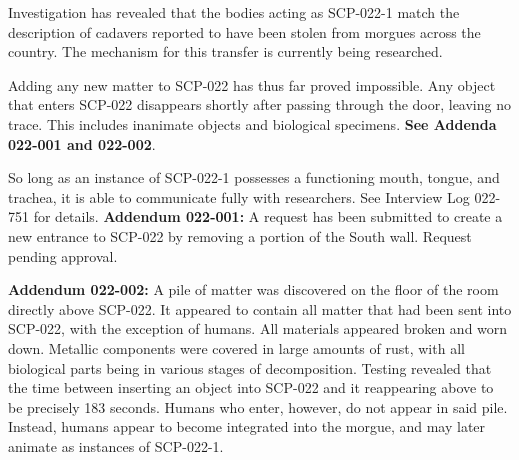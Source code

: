 Investigation has revealed that the bodies acting as SCP-022-1 match the description of cadavers reported to have been stolen from morgues across the country. The mechanism for this transfer is currently being researched.

Adding any new matter to SCP-022 has thus far proved impossible. Any object that enters SCP-022 disappears shortly after passing through the door, leaving no trace. This includes inanimate objects and biological specimens. \textbf{See Addenda 022-001 and 022-002}.

So long as an instance of SCP-022-1 possesses a functioning mouth, tongue, and trachea, it is able to communicate fully with researchers. See Interview Log 022-751 for details.
\newpage
\textbf{Addendum 022-001:} A request has been submitted to create a new entrance to SCP-022 by removing a portion of the South wall. Request pending approval.

\textbf{Addendum 022-002:} A pile of matter was discovered on the floor of the room directly above SCP-022. It appeared to contain all matter that had been sent into SCP-022, with the exception of humans. All materials appeared broken and worn down. Metallic components were covered in large amounts of rust, with all biological parts being in various stages of decomposition. Testing revealed that the time between inserting an object into SCP-022 and it reappearing above to be precisely 183 seconds. Humans who enter, however, do not appear in said pile. Instead, humans appear to become integrated into the morgue, and may later animate as instances of SCP-022-1.